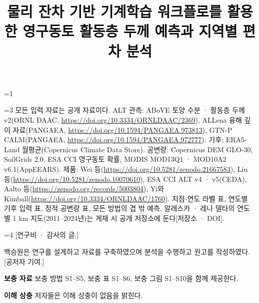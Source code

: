 \providecommand{\frontblock}{0}
\ifnum\frontblock=1
\title[물리 잔차 기반 기계학습의 연도별 활동층 두께 예측]{물리 잔차 기반 기계학습 워크플로를 활용한 영구동토 활동층 두께 예측과 지역별 편차 분석}

\author*[1]{}\email{[교신 저자 전자우편]}
\author[2]{\fnm{[공저자]} \sur{[극지연구소]}}


\fi

\ifnum\frontblock=3
모든 입력 자료는 공개 자료이다. ALT 관측: ABoVE 토양 수분 · 활동층 두께 v2(ORNL DAAC, \url{https://doi.org/10.3334/ORNLDAAC/2369}), ALLena 융해 깊이 자료(PANGAEA, \url{https://doi.org/10.1594/PANGAEA.973813}), GTN-P CALM(PANGAEA, \url{https://doi.org/10.1594/PANGAEA.972777}). 기후: ERA5-Land 월평균(Copernicus Climate Data Store). 공변량: Copernicus DEM GLO-30, SoilGrids 2.0, ESA CCI 영구동토 확률, MODIS MOD13Q1 · MOD10A2 v6.1(AppEEARS). 제품: Wei 등(\url{https://doi.org/10.5281/zenodo.21667583}), Liu 등(\url{https://doi.org/10.5281/zenodo.10070610}), ESA CCI ALT v4 · v5(CEDA), Aalto 등(\url{https://zenodo.org/records/5003804}), Yi와 Kimball(\url{https://doi.org/10.3334/ORNLDAAC/1760}). 지점-연도 라벨 표, 연도별 기후 입력 표, 정적 공변량 표, 모든 방법의 겹 밖 예측, 알래스카 · 레나 델타의 연도별 1 km 지도(2011--2024년)는 게재 시 공개 저장소에 둔다[저장소 · DOI].
\fi

\ifnum\frontblock=4
[연구비 · 감사의 글.]

백승원은 연구를 설계하고 자료를 구축하였으며 분석을 수행하고 원고를 작성하였다. [공저자 기여.]

\textbf{보충 자료} 보충 방법 S1--S5, 보충 표 S1--S6, 보충 그림 S1--S10을 함께 제공한다.

\textbf{이해 상충} 저자들은 이해 상충이 없음을 밝힌다.
\fi
